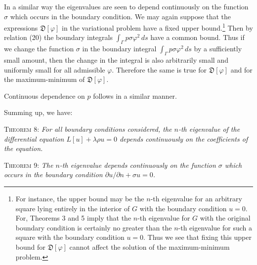 In a similar way the eigenvalues are seen to depend continuously on the function $\sigma$ which occurs in the boundary condition. We may again suppose that the expressions $\mathfrak D[\varphi]$ in the variational problem have a fixed upper bound.\footnote{For instance, the upper bound may be the $n$-th eigenvalue for an arbitrary square lying entirely in the interior of $G$ with the boundary condition $u=0$. For, Theorems 3 and 5 imply that the $n$-th eigenvalue for $G$ with the original boundary condition is certainly no greater than the $n$-th eigenvalue for such a square with the boundary condition $u=0$. Thus we see that fixing this upper bound for $\mathfrak D[\varphi]$ cannot affect the solution of the maximum-minimum problem.} Then by relation (20) the boundary integrals $\int_\Gamma p\sigma\varphi^2\,ds$ have a common bound. Thus if we change the function $\sigma$ in the boundary integral $\int_\Gamma p\sigma\varphi^2\,ds$ by a sufficiently small amount, then the change in the integral is also arbitrarily small and uniformly small for all admissible $\varphi$. Therefore the same is true for $\mathfrak D[\varphi]$ and for the maximum-minimum of $\mathfrak D[\varphi]$.

Continuous dependence on $p$ follows in a similar manner.

Summing up, we have:

\textsc{Theorem 8:} \emph{For all boundary conditions considered, the $n$-th eigenvalue of the differential equation $L[u]+\lambda\rho u=0$ depends continuously on the coefficients of the equation.}

\textsc{Theorem 9:} \emph{The $n$-th eigenvalue depends continuously on the function $\sigma$ which occurs in the boundary condition $\partial u/\partial n+\sigma u=0$.}


